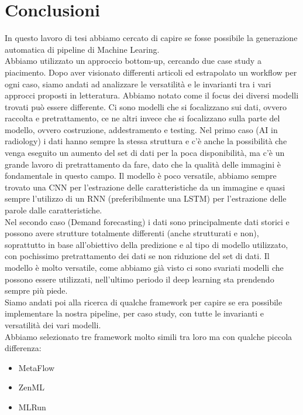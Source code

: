 \documentclass[12pt,a4paper]{report}
\begin{document}
\chapter{Conclusioni}
In questo lavoro di tesi abbiamo cercato di capire se fosse possibile la generazione automatica di pipeline di Machine Learing.\\
Abbiamo utilizzato un approccio bottom-up, cercando due case study a piacimento. Dopo aver visionato differenti articoli ed estrapolato un workflow per ogni caso, siamo andati ad analizzare le versatilità e le invarianti tra i vari approcci proposti in letteratura.
Abbiamo notato come il focus dei diversi modelli trovati può essere differente. Ci sono modelli che si focalizzano sui dati, ovvero raccolta e pretrattamento, ce ne altri invece che si focalizzano sulla parte del modello, ovvero costruzione, addestramento e testing.
Nel primo caso (AI in radiology) i dati hanno sempre la stessa struttura e c'è anche la possibilità che venga eseguito un aumento del set di dati per la poca disponibilità, ma c'è un grande lavoro di pretrattamento da fare, dato che la qualità delle immagini è fondamentale in questo campo. Il modello è poco versatile, abbiamo sempre trovato una CNN per l'estrazione delle caratteristiche da un immagine e quasi sempre l'utilizzo di un RNN (preferibilmente una LSTM) per l'estrazione delle parole dalle caratteristiche.\\
Nel secondo caso (Demand forecasting) i dati sono principalmente dati storici e possono avere strutture totalmente differenti (anche strutturati e non), soprattutto in base all'obiettivo della predizione e al tipo di modello utilizzato, con pochissimo pretrattamento dei dati se non riduzione del set di dati. Il modello è molto versatile, come abbiamo già visto ci sono svariati modelli che possono essere utilizzati, nell'ultimo periodo il deep learning sta prendendo sempre più piede.\\
Siamo andati poi alla ricerca di qualche framework per capire se era possibile implementare la nostra pipeline, per caso study, con tutte le invarianti e versatilità dei vari modelli.\\
Abbiamo selezionato tre framework molto simili tra loro ma con qualche piccola differenza:
\begin{itemize}
    \item MetaFlow
    \item ZenML
    \item MLRun
\end{itemize}
\end{document}
